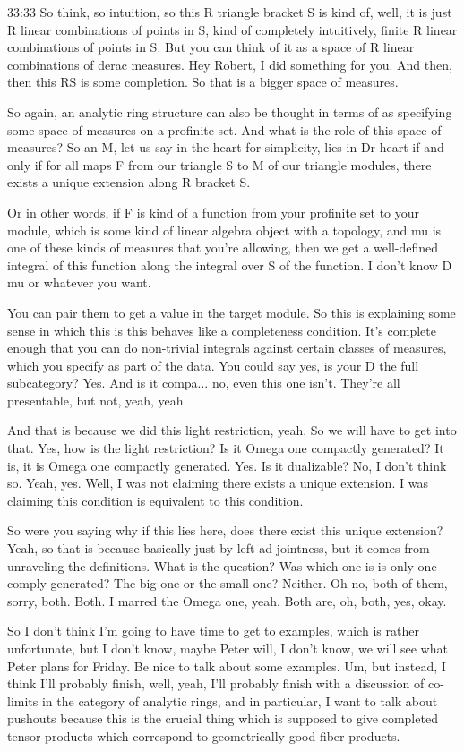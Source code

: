 \begin{unfinished}{33:33}
So think, so intuition, so this R triangle bracket S is kind of, well, it is just R linear combinations of points in S, kind of completely intuitively, finite R linear combinations of points in S. But you can think of it as a space of R linear combinations of derac measures. Hey Robert, I did something for you. And then, then this RS is some completion. So that is a bigger space of measures. 

So again, an analytic ring structure can also be thought in terms of as specifying some space of measures on a profinite set. And what is the role of this space of measures? So an M, let us say in the heart for simplicity, lies in Dr heart if and only if for all maps F from our triangle S to M of our triangle modules, there exists a unique extension along R bracket S. 

Or in other words, if F is kind of a function from your profinite set to your module, which is some kind of linear algebra object with a topology, and mu is one of these kinds of measures that you're allowing, then we get a well-defined integral of this function along the integral over S of the function. I don't know D mu or whatever you want. 

You can pair them to get a value in the target module. So this is explaining some sense in which this is this behaves like a completeness condition. It's complete enough that you can do non-trivial integrals against certain classes of measures, which you specify as part of the data. You could say yes, is your D the full subcategory? Yes. And is it compa... no, even this one isn't. They're all presentable, but not, yeah, yeah. 

And that is because we did this light restriction, yeah. So we will have to get into that. Yes, how is the light restriction? Is it Omega one compactly generated? It is, it is Omega one compactly generated. Yes. Is it dualizable? No, I don't think so. Yeah, yes. Well, I was not claiming there exists a unique extension. I was claiming this condition is equivalent to this condition. 

So were you saying why if this lies here, does there exist this unique extension? Yeah, so that is because basically just by left ad jointness, but it comes from unraveling the definitions. What is the question? Was which one is is only one comply generated? The big one or the small one? Neither. Oh no, both of them, sorry, both. Both. I marred the Omega one, yeah. Both are, oh, both, yes, okay. 

So I don't think I'm going to have time to get to examples, which is rather unfortunate, but I don't know, maybe Peter will, I don't know, we will see what Peter plans for Friday. Be nice to talk about some examples. Um, but instead, I think I'll probably finish, well, yeah, I'll probably finish with a discussion of co-limits in the category of analytic rings, and in particular, I want to talk about pushouts because this is the crucial thing which is supposed to give completed tensor products which correspond to geometrically good fiber products. 


\end{unfinished}
